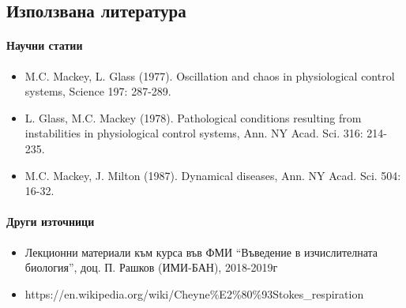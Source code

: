 \documentclass[11pt]{article}
\providecommand{\tightlist}{%
      \setlength{\itemsep}{0pt}\setlength{\parskip}{0pt}}
\begin{document}
    \hypertarget{ux438ux437ux43fux43eux43bux437ux432ux430ux43dux430-ux43bux438ux442ux435ux440ux430ux442ux443ux440ux430}{%
\subsection{Използвана
литература}\label{ux438ux437ux43fux43eux43bux437ux432ux430ux43dux430-ux43bux438ux442ux435ux440ux430ux442ux443ux440ux430}}

\hypertarget{ux43dux430ux443ux447ux43dux438-ux441ux442ux430ux442ux438ux438}{%
\paragraph{Научни
статии}\label{ux43dux430ux443ux447ux43dux438-ux441ux442ux430ux442ux438ux438}}

\begin{itemize}
\tightlist
\item
  M.C. Mackey, L. Glass (1977). Oscillation and chaos in physiological
  control systems, Science 197: 287-289.
\item
  L. Glass, M.C. Mackey (1978). Pathological conditions resulting from
  instabilities in physiological control systems, Ann. NY Acad. Sci.
  316: 214-235.
\item
  M.C. Mackey, J. Milton (1987). Dynamical diseases, Ann. NY Acad. Sci.
  504: 16-32.
\end{itemize}

\hypertarget{ux434ux440ux443ux433ux438-ux438ux437ux442ux43eux447ux43dux438ux446ux438}{%
\paragraph{Други
източници}\label{ux434ux440ux443ux433ux438-ux438ux437ux442ux43eux447ux43dux438ux446ux438}}

\begin{itemize}
\tightlist
\item
  Лекционни материали към курса във ФМИ ``Въведение в изчислителната
  биология'', доц. П. Рашков (ИМИ-БАН), 2018-2019г
\item
  https://en.wikipedia.org/wiki/Cheyne\%E2\%80\%93Stokes\_respiration
\end{itemize}


    
    
    
    
\end{document}
